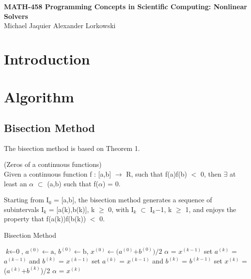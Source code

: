 \documentclass[11pt, a4paper]{article}
\begin{document}
\begingroup
\thispagestyle{empty}
\centering
\par\normalfont\fontsize{15}{20}\sffamily\selectfont
\textbf{MATH-458 Programming Concepts in Scientific Computing: Nonlinear Solvers}\\
\vspace*{0.4cm}
{\large{Michael Jaquier}}
\hspace*{0.5cm}
{\large{Alexander Lorkowski}}\par 
\endgroup

\section{Introduction}

\section{Algorithm}
\subsection{Bisection Method}
The bisection method is based on Theorem 1.
\begin{theo}
  (Zeros of a continuous functions)\\
  Given a continuous function f : [a,b] $\rightarrow$ R, such that f(a)f(b) $<$ 0, then $\exists$ at least an $\alpha$ $\subset$ (a,b) such that f($\alpha$) = 0.
\end{theo}

Starting from I$_0$ = [a,b], the bisection method generates a sequence of subintervals I$_k$ = [a(k),b(k)], k $\geq$ 0, with I$_k$ $\subset$ I$_k$−1, k $\geq$ 1, and enjoys the property that f(a(k))f(b(k)) $<$ 0.

\begin{algorithm}
  \caption{Bisection Method}\label{bisection}
  \begin{algorithmic}[1]
    \State  $\textit{k} \gets \text{0}$, $\textit{$a^{(0)}$} \gets \text{a}$, $\textit{$b^{(0)}$} \gets \text{b}$, $\textit{$x^{(0)}$} \gets \text{($a^{(0)}$+$b^{(0)}$)/2}$
    \Return $\alpha$ = $x^{(k-1)}$
    \Else
    \State set $a^{(k)}$ = $a^{(k-1)}$ and $b^{(k)}$ = $x^{(k-1)}$
    \EndIf
    \State set $a^{(k)}$ = $x^{(k-1)}$ and $b^{(k)}$ = $b^{(k-1)}$
    \EndIf
    \State set $x^{(k)}$ = ($a^{(k)}$+$b^{(k)}$)/2
    \EndIf
    \EndWhile
    \Return $\alpha$ = $x^{(k)}$
  \end{algorithmic}
\end{algorithm}
\end{document}
